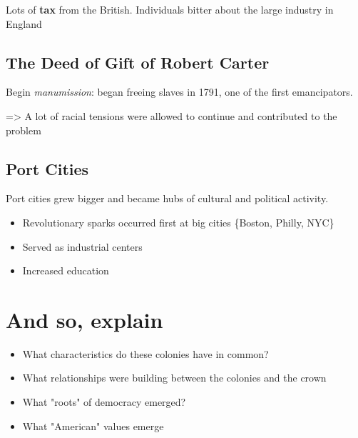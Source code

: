 \documentclass[letterpaper]{article}
\begin{document}
Lots of \textbf{\textbf{tax}} from the British. Individuals bitter about the large industry in England 

\subsection{The Deed of Gift of Robert Carter}
\label{sec:org2f99a0d}
Begin \emph{manumission}: began freeing slaves in 1791, one of the first emancipators.

=> A lot of racial tensions were allowed to continue and contributed to the problem

\subsection{Port Cities}
\label{sec:org0c4a27a}
Port cities grew bigger and became hubs of cultural and political activity.

\begin{itemize}
\item Revolutionary sparks occurred first at big cities \{Boston, Philly, NYC\}
\item Served as industrial centers
\item Increased education
\end{itemize}



\section{And so, explain}
\label{sec:org6e9e633}
\begin{itemize}
\item What characteristics do these colonies have in common?
\item What relationships were building between the colonies and the crown
\item What "roots" of democracy emerged?
\item What "American" values emerge
\end{itemize}
\end{document}
